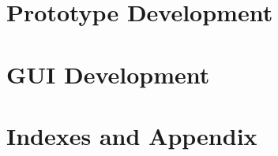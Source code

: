 \documentclass{thesis}
\begin{document}




\renewcommand{\baselinestretch}{0.8}
\tableofcontents
\renewcommand{\baselinestretch}{1.2}

\normalsize


\printnomenclature
{}



\begin{sloppypar}

    
    \part{Prototype Development}
    
    
    
    
    

    \part{GUI Development}
    \setcounter{chapter}{0}
    

    \part{Indexes and Appendix}
    \listoffigures

    \listoftables

    
    

    \appendix
    



\end{sloppypar}
\end{document}
